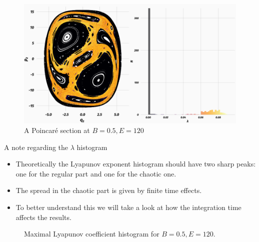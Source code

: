 \documentclass{beamer}
\begin{document}

\begin{frame}
	\begin{figure}
		\includegraphics[width=\textwidth]{poincare}
		\caption{A Poincaré section at \(B=0.5, E=120\)}
	\end{figure}
\end{frame}


\begin{frame}{A note regarding the \(\lambda\) histogram}
	\begin{itemize}
		\item Theoretically the Lyapunov exponent histogram should
		have two sharp peaks: one for the regular part and one for
		the chaotic one.
		\item The spread in the chaotic part is given by finite time
		effects.
		\item To better understand this we will take a look at how
		the integration time affects the results.
	\end{itemize}
\end{frame}


\begin{frame}
	\begin{figure}
		
		\caption{Maximal Lyapunov coefficient histogram for \(B=0.5, E=120\).}
	\end{figure}
\end{frame}

\end{document}
